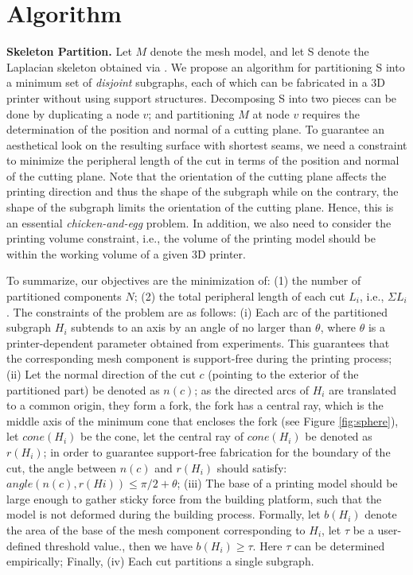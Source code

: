 \section{Algorithm}
\textbf{Skeleton Partition.} Let $M$ denote the mesh model, and let S denote the Laplacian skeleton obtained via \cite{AuTCCL08}. We propose an algorithm for partitioning S into a minimum set of \emph{disjoint} subgraphs, each of which can be fabricated in a 3D printer without using support structures. Decomposing S into two pieces can be done by duplicating a node $v$; and partitioning $M$ at node $v$ requires the determination of the position and normal of a cutting plane. To guarantee an aesthetical look on the resulting surface with shortest seams, we need a constraint to minimize the peripheral length of the cut in terms of the position and normal of the cutting plane. Note that the orientation of the cutting plane affects the printing direction and thus the shape of the subgraph while on the contrary, the shape of the subgraph limits the orientation of the cutting plane. Hence, this is an essential \emph{chicken-and-egg} problem. In addition, we also need to consider the printing volume constraint, i.e., the volume of the printing model should be within the working volume of a given 3{D} printer.

To summarize, our objectives are the minimization of: (1) the number of partitioned components $N$; (2) the total peripheral length of each cut $L_i$, i.e., $\Sigma L_i$. The constraints of the problem are as follows:
(i) Each arc of the partitioned subgraph $H_i$ subtends to an axis by an angle of no larger than $\theta$, where $\theta$ is a printer-dependent parameter obtained from experiments. This guarantees that the corresponding mesh component is support-free during the printing process;
(ii) Let the normal direction of the cut $c$ (pointing to the exterior of the partitioned part) be denoted as $n(c)$; as the directed arcs of $H_i$ are translated to a common origin, they form a fork, the fork has a central ray, which is the middle axis of the minimum cone that encloses the fork (see Figure \ref{fig:sphere}), let $cone(H_i)$ be the cone, let the central ray of $cone(H_i)$ be denoted as $r(H_i)$; in order to guarantee support-free fabrication for the boundary of the cut, the angle between $n(c)$ and $r(H_i)$ should satisfy: $angle(n(c), r(Hi)) \leq \pi/2 + \theta$;
(iii) The base of a printing model should be large enough to gather sticky force from the building platform, such that the model is not deformed during the building process. Formally, let $b(H_i)$ denote the area of the base of the mesh component corresponding to $H_i$, let $\tau$ be a user-defined threshold value., then we have $b(H_i) \geq \tau$. Here $\tau$ can be determined empirically; Finally,
(iv) Each cut partitions a single subgraph.


